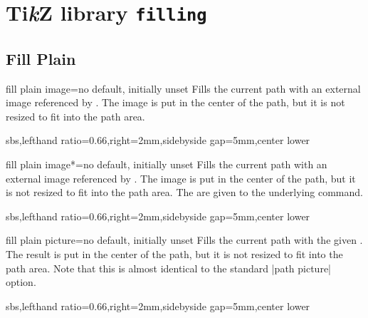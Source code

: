 \documentclass{article}
\newenvironment{dispExample*}[1]{\par}{}
\begin{document}
\section{Ti\emph{k}Z library \texttt{filling}}


\subsection{Fill Plain}
\begin{docTikzKey}{fill plain image}{=}{no default, initially unset}
  Fills the current path with an external image referenced by .
  The image is put in the center of the path, but it is not resized to fit into
  the path area.
\begin{dispExample*}{sbs,lefthand ratio=0.66,right=2mm,sidebyside gap=5mm,center lower}
\end{dispExample*}
\end{docTikzKey}


\begin{docTikzKey}{fill plain image*}{=}{no default, initially unset}
  Fills the current path with an external image referenced by .
  The image is put in the center of the path, but it is not resized to fit into
  the path area.
  The  are given to the underlying  command.
\begin{dispExample*}{sbs,lefthand ratio=0.66,right=2mm,sidebyside gap=5mm,center lower}
\end{dispExample*}
\end{docTikzKey}

\enlargethispage*{1cm}

\begin{docTikzKey}{fill plain picture}{=}{no default, initially unset}
  Fills the current path with the given .
  The result is put in the center of the path, but it is not resized to fit into
  the path area. Note that this is almost identical to the standard |path picture| option.
\begin{dispExample*}{sbs,lefthand ratio=0.66,right=2mm,sidebyside gap=5mm,center lower}
\end{dispExample*}
\end{docTikzKey}
\end{document}
